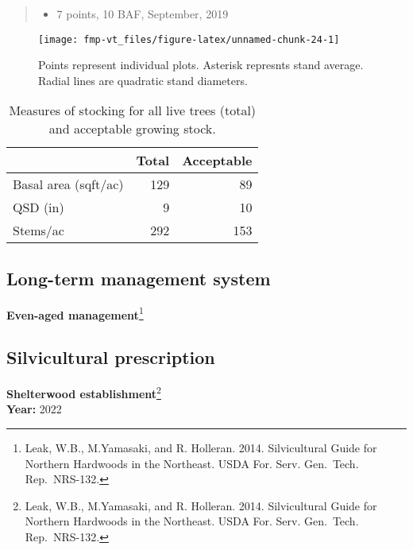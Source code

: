 \documentclass[]{tufte-handout}
\providecommand{\tightlist}{%
  \setlength{\itemsep}{0pt}\setlength{\parskip}{0pt}}
\begin{document}
\begin{quote}
\begin{itemize}
\tightlist
\item
  7 points, 10 BAF, September, 2019
\end{itemize}
\end{quote}

\begin{figure}
\texttt{[image: fmp-vt\_files/figure-latex/unnamed-chunk-24-1]} \caption[Points represent individual plots]{Points represent individual plots. Asterisk represnts stand average. Radial lines are quadratic stand diameters.}\label{fig:unnamed-chunk-24}
\end{figure}

\begin{table}

\caption{\label{tab:unnamed-chunk-25}Measures of stocking for all live trees (total) and acceptable growing stock.}
\centering
\begin{tabular}[t]{lrr}
\toprule
  & Total & Acceptable\\
\midrule
Basal area (sqft/ac) & 129 & 89\\
QSD (in) & 9 & 10\\
Stems/ac & 292 & 153\\
\bottomrule
\end{tabular}
\end{table}

\subsection{Long-term management
system}\label{long-term-management-system-5}

\textbf{Even-aged management}\footnote{Leak, W.B., M.Yamasaki, and R.
  Holleran. 2014. Silvicultural Guide for Northern Hardwoods in the
  Northeast. USDA For. Serv. Gen.~Tech. Rep.~NRS-132.}

\subsection{Silvicultural
prescription}\label{silvicultural-prescription-5}

\textbf{Shelterwood establishment}\footnote{Leak, W.B., M.Yamasaki, and
  R. Holleran. 2014. Silvicultural Guide for Northern Hardwoods in the
  Northeast. USDA For. Serv. Gen.~Tech. Rep.~NRS-132.}\\
\textbf{Year:} 2022

\newpage
\end{document}
